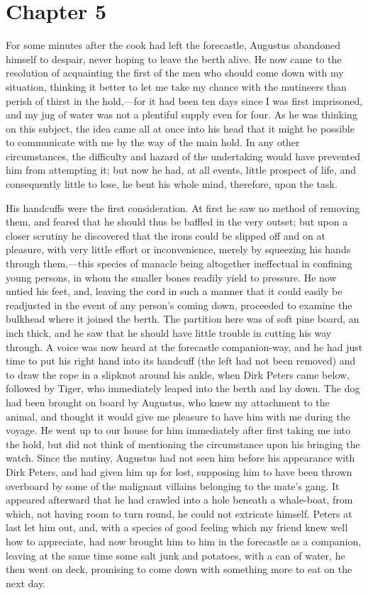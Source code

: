 \section{Chapter 5}
For some minutes after the cook had left the forecastle, Augustus
abandoned himself to despair, never hoping to leave the berth alive. He now came
to the resolution of acquainting the first of the men who should come down with
my situation, thinking it better to let me take my chance with the mutineers
than perish of thirst in the hold,---for it had been ten days since I was first
imprisoned, and my jug of water was not a plentiful supply even for four. As he
was thinking on this subject, the idea came all at once into his head that it
might be possible to communicate with me by the way of the main hold. In any
other circumstances, the difficulty and hazard of the undertaking would have
prevented him from attempting it; but now he had, at all events, little prospect
of life, and consequently little to lose, he bent his whole mind, therefore,
upon the task. 

His handcuffs were the first consideration. At first he saw no method of
removing them, and feared that he should thus be baffled in the very outset; but
upon a closer scrutiny he discovered that the irons could be slipped off and on
at pleasure, with very little effort or inconvenience, merely by squeezing his
hands through them,---this species of manacle being altogether ineffectual in
confining young persons, in whom the smaller bones readily yield to pressure. He
now untied his feet, and, leaving the cord in such a manner that it could easily
be readjusted in the event of any person's coming down, proceeded to examine the
bulkhead where it joined the berth. The partition here was of soft pine board,
an inch thick, and he saw that he should have little trouble in cutting his way
through. A voice was now heard at the forecastle companion-way, and he had just
time to put his right hand into its handcuff (the left had not been removed) and
to draw the rope in a slipknot around his ankle, when Dirk Peters came below,
followed by Tiger, who immediately leaped into the berth and lay down. The dog
had been brought on board by Augustus, who knew my attachment to the animal, and
thought it would give me pleasure to have him with me during the voyage. He went
up to our house for him immediately after first taking me into the hold, but did
not think of mentioning the circumstance upon his bringing the watch. Since the
mutiny, Augustus had not seen him before his appearance with Dirk Peters, and
had given him up for lost, supposing him to have been thrown overboard by some
of the malignant villains belonging to the mate's gang. It appeared afterward
that he had crawled into a hole beneath a whale-boat, from which, not having
room to turn round, he could not extricate himself. Peters at last let him out,
and, with a species of good feeling which my friend knew well how to appreciate,
had now brought him to him in the forecastle as a companion, leaving at the same
time some salt junk and potatoes, with a can of water, he then went on deck,
promising to come down with something more to eat on the next day. 

